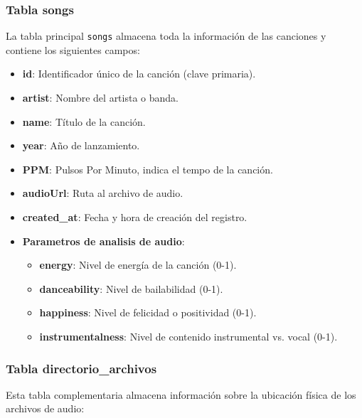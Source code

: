 \documentclass[a4paper,12pt]{article}
\begin{document}
\subsubsection{Tabla songs}

La tabla principal \texttt{songs} almacena toda la información de las canciones y contiene los siguientes campos:

\begin{itemize}
    \item \textbf{id}: Identificador único de la canción (clave primaria).
    \item \textbf{artist}: Nombre del artista o banda.
    \item \textbf{name}: Título de la canción.
    \item \textbf{year}: Año de lanzamiento.
    \item \textbf{PPM}: Pulsos Por Minuto, indica el tempo de la canción.
    \item \textbf{audioUrl}: Ruta al archivo de audio.
    \item \textbf{created\_at}: Fecha y hora de creación del registro.
    \item \textbf{Parametros de analisis de audio}:
    \begin{itemize}
        \item \textbf{energy}: Nivel de energía de la canción (0-1).
        \item \textbf{danceability}: Nivel de bailabilidad (0-1).
        \item \textbf{happiness}: Nivel de felicidad o positividad (0-1).
        \item \textbf{instrumentalness}: Nivel de contenido instrumental vs. vocal (0-1).
    \end{itemize}
\end{itemize}

\subsubsection{Tabla directorio\_archivos}

Esta tabla complementaria almacena información sobre la ubicación física de los archivos de audio:
\end{document}
